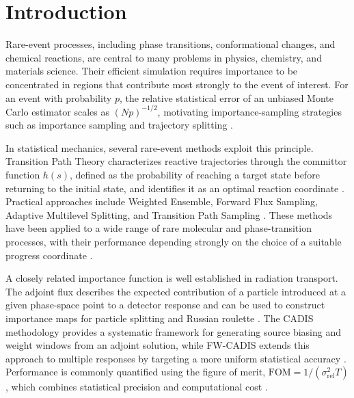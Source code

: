 \documentclass[a4paper,fleqn]{cas-sc}
\begin{document}
	\maketitle
	
	\section{Introduction}\label{sec:intro}
	
	Rare-event processes, including phase transitions, conformational changes, and chemical reactions, are central to many problems in physics, chemistry, and materials science. Their efficient simulation requires importance to be concentrated in regions that contribute most strongly to the event of interest. For an event with probability $p$, the relative statistical error of an unbiased Monte Carlo estimator scales as $(Np)^{-1/2}$, motivating importance-sampling strategies such as importance sampling and trajectory splitting \cite{kahn1951,kahn1953,allen2009,touchette2009}.
	
	In statistical mechanics, several rare-event methods exploit this principle. Transition Path Theory characterizes reactive trajectories through the committor function $h(s)$, defined as the probability of reaching a target state before returning to the initial state, and identifies it as an optimal reaction coordinate \cite{e2006,metzner2009,evanden2010}. Practical approaches include Weighted Ensemble, Forward Flux Sampling, Adaptive Multilevel Splitting, and Transition Path Sampling \cite{huber1996,zhang2010,allen2009,cerou2007,bolhuis2002}. These methods have been applied to a wide range of rare molecular and phase-transition processes, with their performance depending strongly on the choice of a suitable progress coordinate \cite{allen2009,zuckerman2017}.
	
	A closely related importance function is well established in radiation transport. The adjoint flux describes the expected contribution of a particle introduced at a given phase-space point to a detector response and can be used to construct importance maps for particle splitting and Russian roulette \cite{lewins1965,bell1970,booth1984}. The CADIS methodology provides a systematic framework for generating source biasing and weight windows from an adjoint solution, while FW-CADIS extends this approach to multiple responses by targeting a more uniform statistical accuracy \cite{wagner1998,haghighat2003,wagnerfw2014,cooper2001}. Performance is commonly quantified using the figure of merit,
	$\mathrm{FOM}=1/(\sigma_{\mathrm{rel}}^{2}T)$, which combines statistical precision and computational cost \cite{spanier1969,wagnerfw2014}.
	
\end{document}
